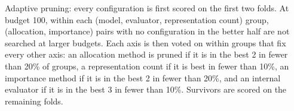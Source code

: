Adaptive pruning: every configuration is first scored on the first two folds. At budget 100, within each (model, evaluator, representation count) group, (allocation, importance) pairs with no configuration in the better half are not searched at larger budgets. Each axis is then voted on within groups that fix every other axis: an allocation method is pruned if it is in the best 2 in fewer than 20\% of groups, a representation count if it is best in fewer than 10\%, an importance method if it is in the best 2 in fewer than 20\%, and an internal evaluator if it is in the best 3 in fewer than 10\%. Survivors are scored on the remaining folds.

